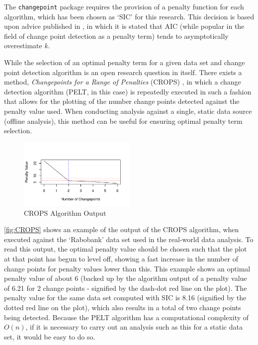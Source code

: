 \documentclass[../main.tex]{subfiles}
\begin{document}
The \texttt{changepoint} package requires the provision of a penalty function for each algorithm, which has been chosen as `SIC' for this research. This decision is based upon advice published in \cite{Eckley2011}, in which it is stated that AIC (while popular in the field of change point detection as a penalty term) tends to asymptotically overestimate $k$.

While the selection of an optimal penalty term for a given data set and change point detection algorithm is an open research question in itself. There exists a method, \emph{Changepoints for a Range of Penalties} (CROPS) \cite{Haynes2014}, in which a change detection algorithm (PELT, in this case) is repeatedly executed in such a fashion that allows for the plotting of the number change points detected against the penalty value used. When conducting analysis against a single, static data source (offline analysis), this method can be useful for ensuring optimal penalty term selection.

\begin{figure}[h]
\centering
    \includegraphics[width=0.5\textwidth]{figures/CROPS2}
    \caption{CROPS Algorithm Output}
    \label{fig:CROPS}
\end{figure}

\autoref{fig:CROPS} shows an example of the output of the CROPS algorithm, when executed against the `Rabobank' data set used in the real-world data analysis. To read this output, the optimal penalty value should be chosen such that the plot at that point has begun to level off, showing a fast increase in the number of change points for penalty values lower than this. This example shows an optimal penalty value of about 6 (backed up by the algorithm output of a penalty value of 6.21 for 2 change points - signified by the dash-dot red line on the plot). The penalty value for the same data set computed with SIC is 8.16 (signified by the dotted red line on the plot), which also results in a total of two change points being detected. Because the PELT algorithm has a computational complexity of $O(n)$, if it is necessary to carry out an analysis such as this for a static data set, it would be easy to do so.
\end{document}
